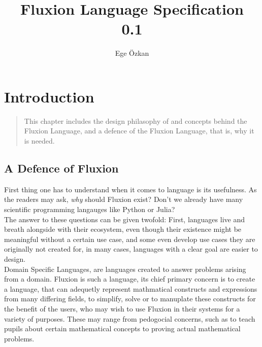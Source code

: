 \documentclass[11pt,a4paper]{book}
\author{Ege Özkan}
\title{Fluxion Language Specification \\ \large{0.1}}
\begin{document}
\newcommand{\diff}[2]{\ensuremath{\frac{\text{d}}{\text{d}#1} \left(#2\right)}}
\newcommand{\sdif}[2]{\ensuremath{\frac{\text{d}#1}{\text{d}#2}}}
\newcommand{\pdif}[2]{\ensuremath{\frac{\partial}{\partial #1} \left(#2\right)}}
\newcommand{\spdif}[2]{\ensuremath{\frac{\partial #1}{\partial #2}}}
\newcommand{\term}[1]{\ensuremath{\left(#1\right)}}
\newcommand{\oftype}{\ensuremath{\in^\text{T}}}
\newcommand{\intx}[1]{\ensuremath{\int \left(#1\right) \text{d}x}}
\newcommand{\iscons}{\ensuremath{\oftype \mathbf{C}}}
\frontmatter
\maketitle



\tableofcontents
\newpage


\chapter{Introduction}
\vspace{1em}
\begin{quotation}
This chapter includes the design philasophy of and concepts behind the Fluxion Language, and a defence of the Fluxion Language, that is, why it is needed.
\end{quotation}

\newpage
\section*{A Defence of Fluxion}

First thing one has to understand when it comes to language is its usefulness. As the readers may ask, \textit{why} should Fluxion exist? Don't we already have many scientific programming langauges like Python or Julia?\\

The answer to these questions can be given twofold: First, languages live and breath alongside with their ecosystem, even though their existence might be meaningful without a certain use case, and some even develop use cases they are originally not created for, in many cases, languages with a clear goal are easier to design.\\

Domain Specific Languages, are languages created to answer problems arising from a domain. Fluxion is such a language, its chief primary concern is to create a language, that can adequetly represent mathmatical constructs and expressions from many differing fields, to simplify, solve or to manuplate these constructs for the benefit of the users, who may wish to use Fluxion in their systems for a variety of purposes. These may range from pedogocial concerns, such as to teach pupils about certain mathematical concepts to proving actual mathematical problems.\\
\end{document}
